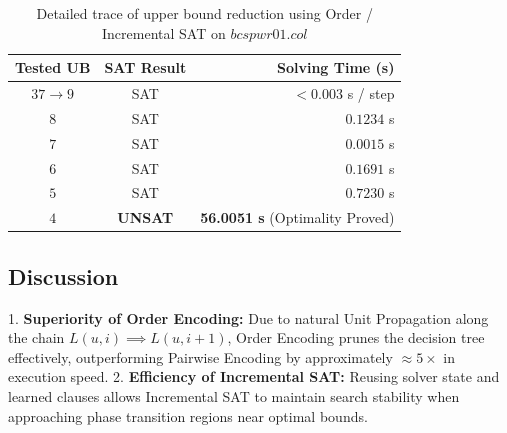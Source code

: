 \begin{table}[h]
\caption{Detailed trace of upper bound reduction using Order / Incremental SAT on $bcspwr01.col$}
\label{tab:trace_bcspwr01}
\centering
\begin{tabular}{ccr}
\toprule
\textbf{Tested UB} & \textbf{SAT Result} & \textbf{Solving Time (s)} \\
\midrule
$37 \to 9$ & SAT & $< 0.003$ s / step \\
$8$ & SAT & $0.1234$ s \\
$7$ & SAT & $0.0015$ s \\
$6$ & SAT & $0.1691$ s \\
$5$ & SAT & $0.7230$ s \\
$4$ & \textbf{UNSAT} & \textbf{56.0051 s} (Optimality Proved) \\
\bottomrule
\end{tabular}
\end{table}

\subsection{Discussion}
1. \textbf{Superiority of Order Encoding:} Due to natural Unit Propagation along the chain $L(u, i) \implies L(u, i+1)$, Order Encoding prunes the decision tree effectively, outperforming Pairwise Encoding by approximately $\approx 5\times$ in execution speed.
2. \textbf{Efficiency of Incremental SAT:} Reusing solver state and learned clauses allows Incremental SAT to maintain search stability when approaching phase transition regions near optimal bounds.